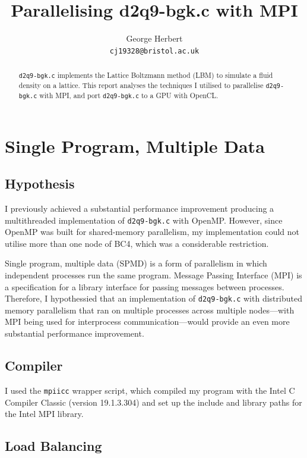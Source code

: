 \documentclass[twocolumn, a4paper]{article}
\author{
  George Herbert\\
  \texttt{cj19328@bristol.ac.uk}
}
\title{\vspace{-2em}Parallelising d2q9-bgk.c with MPI}
\begin{document}
\maketitle

\begin{abstract}
  \texttt{d2q9-bgk.c} implements the Lattice Boltzmann method (LBM) to simulate a fluid density on a lattice.
  This report analyses the techniques I utilised to parallelise \texttt{d2q9-bgk.c} with MPI, and port \texttt{d2q9-bgk.c} to a GPU with OpenCL.
\end{abstract}

\section{Single Program, Multiple Data}

\subsection{Hypothesis}

I previously achieved a substantial performance improvement producing a multithreaded implementation of \texttt{d2q9-bgk.c} with OpenMP.
However, since OpenMP was built for shared-memory parallelism, my implementation could not utilise more than one node of BC4, which was a considerable restriction.

Single program, multiple data (SPMD) is a form of parallelism in which independent processes run the same program.
Message Passing Interface (MPI) is a specification for a library interface for passing messages between processes.
Therefore, I hypothessied that an implementation of \texttt{d2q9-bgk.c} with distributed memory parallelism that ran on multiple processes across multiple nodes---with MPI being used for interprocess communication---would provide an even more substantial performance improvement.

\subsection{Compiler}

I used the \texttt{mpiicc} wrapper script, which compiled my program with the Intel C Compiler Classic (version 19.1.3.304) and set up the include and library paths for the Intel MPI library.

\subsection{Load Balancing}
\end{document}
